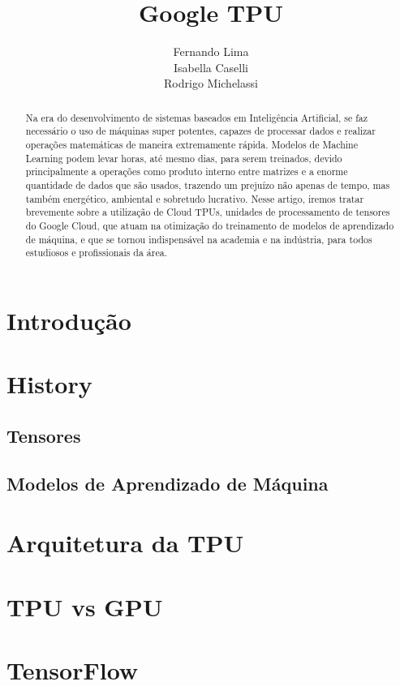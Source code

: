 \documentclass{article}
\title{Google TPU}
\author{Fernando Lima \\ Isabella Caselli \\ Rodrigo Michelassi}
\begin{document}
\maketitle

\begin{abstract}
Na era do desenvolvimento de sistemas baseados em Inteligência Artificial, se faz necessário o uso de máquinas super potentes, capazes de processar dados e realizar operações matemáticas de maneira extremamente rápida. Modelos de Machine Learning podem levar horas, até mesmo dias, para serem treinados, devido principalmente a operações como produto interno entre matrizes e a enorme quantidade de dados que são usados, trazendo um prejuízo não apenas de tempo, mas também energético, ambiental e sobretudo lucrativo. Nesse artigo, iremos tratar brevemente sobre a utilização de Cloud TPUs, unidades de processamento de tensores do Google Cloud, que atuam na otimização do treinamento de modelos de aprendizado de máquina, e que se tornou indispensável na academia e na indústria, para todos estudiosos e profissionais da área.
\end{abstract}

\section{Introdução}

\section{History}

\subsection{Tensores}

\subsection{Modelos de Aprendizado de Máquina}

\section{Arquitetura da TPU}

\section{TPU vs GPU}

\section{TensorFlow}
\end{document}
